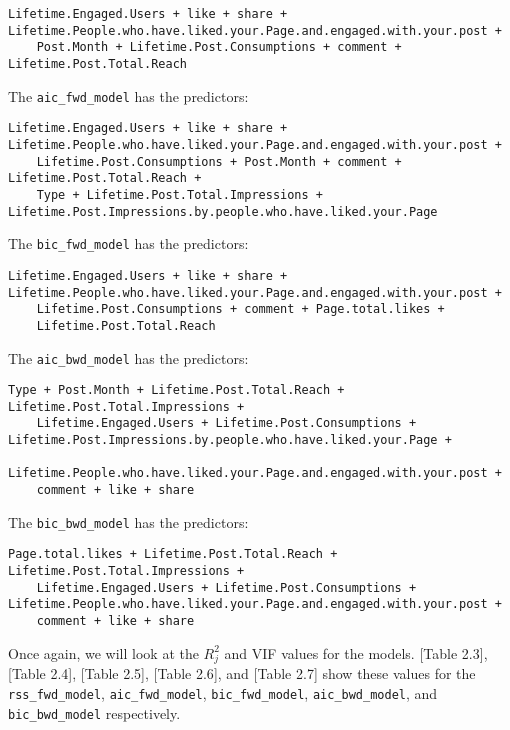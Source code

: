 \documentclass[
]{article}
\begin{document}
\begin{verbatim}
Lifetime.Engaged.Users + like + share + Lifetime.People.who.have.liked.your.Page.and.engaged.with.your.post + 
    Post.Month + Lifetime.Post.Consumptions + comment + Lifetime.Post.Total.Reach
\end{verbatim}

The \texttt{aic\_fwd\_model} has the predictors:

\begin{verbatim}
Lifetime.Engaged.Users + like + share + Lifetime.People.who.have.liked.your.Page.and.engaged.with.your.post + 
    Lifetime.Post.Consumptions + Post.Month + comment + Lifetime.Post.Total.Reach + 
    Type + Lifetime.Post.Total.Impressions + Lifetime.Post.Impressions.by.people.who.have.liked.your.Page
\end{verbatim}

The \texttt{bic\_fwd\_model} has the predictors:

\begin{verbatim}
Lifetime.Engaged.Users + like + share + Lifetime.People.who.have.liked.your.Page.and.engaged.with.your.post + 
    Lifetime.Post.Consumptions + comment + Page.total.likes + 
    Lifetime.Post.Total.Reach
\end{verbatim}

The \texttt{aic\_bwd\_model} has the predictors:

\begin{verbatim}
Type + Post.Month + Lifetime.Post.Total.Reach + Lifetime.Post.Total.Impressions + 
    Lifetime.Engaged.Users + Lifetime.Post.Consumptions + Lifetime.Post.Impressions.by.people.who.have.liked.your.Page + 
    Lifetime.People.who.have.liked.your.Page.and.engaged.with.your.post + 
    comment + like + share
\end{verbatim}

The \texttt{bic\_bwd\_model} has the predictors:

\begin{verbatim}
Page.total.likes + Lifetime.Post.Total.Reach + Lifetime.Post.Total.Impressions + 
    Lifetime.Engaged.Users + Lifetime.Post.Consumptions + Lifetime.People.who.have.liked.your.Page.and.engaged.with.your.post + 
    comment + like + share
\end{verbatim}

Once again, we will look at the \(R^2_j\) and VIF values for the models.
{[}Table 2.3{]}, {[}Table 2.4{]}, {[}Table 2.5{]}, {[}Table 2.6{]}, and
{[}Table 2.7{]} show these values for the \texttt{rss\_fwd\_model},
\texttt{aic\_fwd\_model}, \texttt{bic\_fwd\_model},
\texttt{aic\_bwd\_model}, and \texttt{bic\_bwd\_model} respectively.
\end{document}
